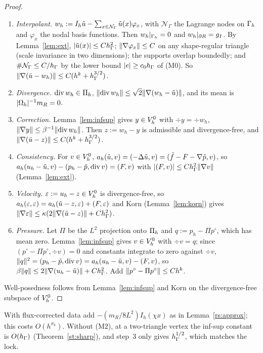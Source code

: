 \begin{proof}
\begin{enumerate}
\item \emph{Interpolant.} $w_h:=I_h\tilde u-\sum_{x\in\mathcal N_\Gamma}\tilde u(x)\varphi_x$, with $\mathcal N_\Gamma$ the Lagrange nodes on $\Gamma_h$ and $\varphi_x$ the nodal basis functions. Then $w_h|_{\Gamma_h}=0$ and $w_h|_{\partial R}=g_I$. By Lemma~\ref{lem:ext}, $|\tilde u(x)|\le Ch_\Gamma^2$; $\lVert \nabla\varphi_x\rVert\le C$ on any shape-regular triangle (scale invariance in two dimensions); the supports overlap boundedly; and $\#\mathcal N_\Gamma\le C/h_\Gamma$ by the lower bound $|e|\ge c_0h_\Gamma$ of (M0). So $\lVert \nabla(\tilde u-w_h)\rVert\le C(h^k+h_\Gamma^{3/2})$.
\item \emph{Divergence.} $\operatorname{div} w_h\in\Pi_h$, $\lVert \operatorname{div} w_h\rVert\le\sqrt2\lVert \nabla(w_h-\tilde u)\rVert$, and its mean is $|\Omega_h|^{-1}m_R=0$.
\item \emph{Correction.} Lemma~\ref{lem:infsup} gives $y\in V_h^0$ with $\div y=\div w_h$, $\lVert \nabla y\rVert\le\beta^{-1}\lVert \operatorname{div} w_h\rVert$. Then $z:=w_h-y$ is admissible and divergence-free, and $\lVert \nabla(\tilde u-z)\rVert\le C(h^k+h_\Gamma^{3/2})$.
\item \emph{Consistency.} For $v\in V_h^0$, $a_h(\tilde u,v)=(-\Delta\tilde u,v)=(\tilde f-F-\nabla\tilde p,v)$, so $a_h(u_h-\tilde u,v)-(p_h-\tilde p,\operatorname{div} v)=(F,v)$ with $|(F,v)|\le Ch_\Gamma^2\lVert \nabla v\rVert$ (Lemma~\ref{lem:ext}).
\item \emph{Velocity.} $\varepsilon:=u_h-z\in V_h^0$ is divergence-free, so $a_h(\varepsilon,\varepsilon)=a_h(\tilde u-z,\varepsilon)+(F,\varepsilon)$ and Korn (Lemma~\ref{lem:korn}) gives $\lVert \nabla\varepsilon\rVert\le\kappa(2\lVert \nabla(\tilde u-z)\rVert+Ch_\Gamma^2)$.
\item \emph{Pressure.} Let $\Pi$ be the $L^2$ projection onto $\Pi_h$ and $q:=p_h-\Pi p^\circ$, which has mean zero. Lemma~\ref{lem:infsup} gives $v\in V_h^0$ with $\div v=q$; since $(p^\circ-\Pi p^\circ,\div v)=0$ and constants integrate to zero against $\div v$, $\lVert q\rVert^2=(p_h-\tilde p,\operatorname{div} v)=a_h(u_h-\tilde u,v)-(F,v)$, so $\beta\lVert q\rVert\le2\lVert \nabla(u_h-\tilde u)\rVert+Ch_\Gamma^2$. Add $\lVert p^\circ-\Pi p^\circ\rVert\le Ch^k$.
\end{enumerate}
Well-posedness follows from Lemma~\ref{lem:infsup} and Korn on the divergence-free subspace of $V_h^0$.
\end{proof}

With flux-corrected data add $-(m_R/8L^2)I_h(\chi x)$ as in Lemma~\ref{rs:approx}; this costs $O(h^{\sigma_k})$. Without (M2), at a two-triangle vertex the inf-sup constant is $O(h_\Gamma)$ (Theorem~\ref{st:sharp}), and step~3 only gives $h_\Gamma^{1/2}$, which matches the lock.

